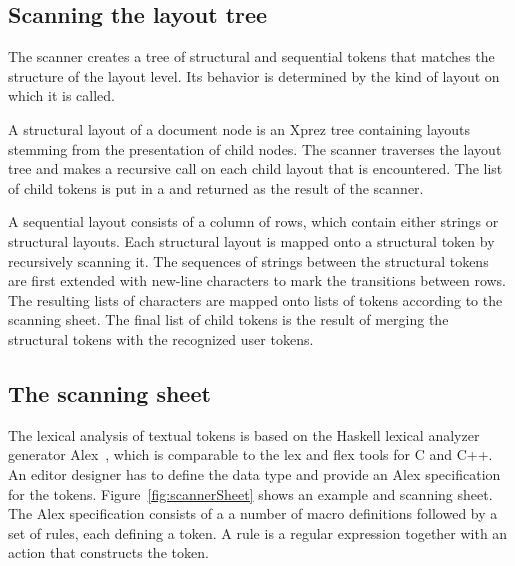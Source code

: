 \documentclass[12pt]{article}
\begin{document}
\subsection{Scanning the layout tree}

The scanner creates a tree of structural and sequential tokens that matches the structure of the layout level. Its behavior is determined by the kind of layout on which it is called.


 A structural layout of a document node is an Xprez tree containing layouts stemming from the presentation of child nodes. The scanner traverses the layout tree and makes a recursive call on each child layout that is encountered. The list of child tokens is put in a  and returned as the result of the scanner.

 A sequential layout consists of a column of rows, which contain either strings or structural layouts. Each structural layout is mapped onto a structural token by recursively scanning it. The sequences of strings between the structural tokens are first extended with new-line characters to mark the transitions between rows. The resulting lists of characters are mapped onto lists of  tokens according to the scanning sheet. The final list of child tokens is the result of merging the structural tokens with the recognized user tokens.


\subsection{The scanning sheet}

The lexical analysis of textual tokens is based on the Haskell lexical analyzer generator Alex~\cite{marlow07alex}, which is comparable to the lex and flex tools for C and C++. An editor designer has to define the data type  and provide an Alex specification for the tokens. Figure~\ref{fig:scannerSheet} shows an example  and scanning sheet. The Alex specification consists of a a number of macro definitions followed by a set of rules, each defining a token. A rule is a regular expression together with an action that constructs the token.
\end{document}

